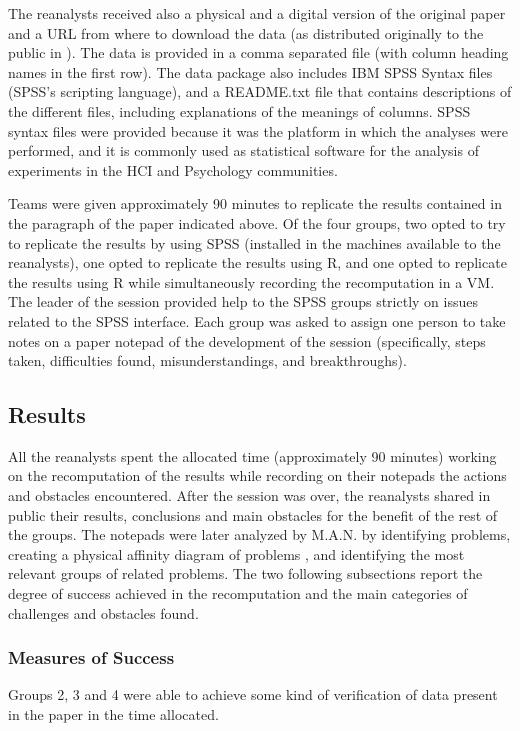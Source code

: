 The reanalysts received also a physical and a digital version of the original paper and a URL from where to download the data (as distributed originally to the public in \cite{Nacenta:memorability_data}). The data is provided in a comma separated file (with column heading names in the first row). The data package also includes IBM SPSS Syntax files (SPSS's scripting language), and a README.txt file that contains descriptions of the different files, including explanations of the meanings of columns. SPSS syntax files were provided because it was the platform in which the analyses were performed, and it is commonly used as statistical software for the analysis of experiments in the HCI and Psychology communities. 

Teams were given approximately 90 minutes to replicate the results contained in the paragraph of the paper indicated above. Of the four groups, two opted to try to replicate the results by using SPSS (installed in the machines available to the reanalysts), one opted to replicate the results using R, and one opted to replicate the results using R while simultaneously recording the recomputation in a VM. The leader of the session provided help to the SPSS groups strictly on issues related to the SPSS interface. Each group was asked to assign one person to take notes on a paper notepad of the development of the session (specifically, steps taken, difficulties found, misunderstandings, and breakthroughs).

\subsection{Results}
All the reanalysts spent the allocated time (approximately 90 minutes) working on the recomputation of the results while recording on their notepads the actions and obstacles encountered. After the session was over, the reanalysts shared in public their results, conclusions and main obstacles for the benefit of the rest of the groups. The notepads were later analyzed by M.A.N. by identifying problems, creating a physical affinity diagram of problems \cite{hartson:2012}, and identifying the most relevant groups of related problems. The two following subsections report the degree of success achieved in the recomputation and the main categories of challenges and obstacles found.

\subsubsection{Measures of Success}
Groups 2, 3 and 4 were able to achieve some kind of verification of data present in the paper in the time allocated.


